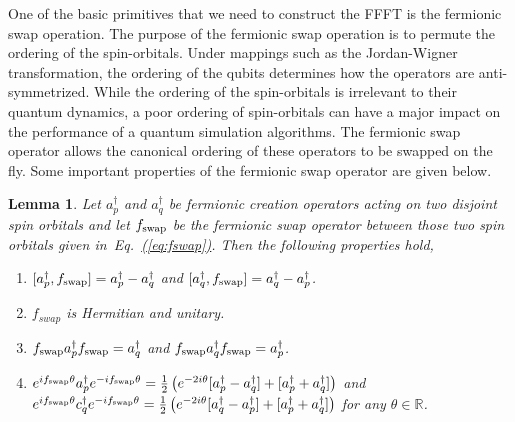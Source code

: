 \documentclass[superscriptaddress,aps,pra,nofootinbib,notitlepage,10pt,longbibliography]{revtex4-1}
\newtheorem{lemma}[theorem]{Lemma}
\newcommand{\eq}[1]{Eq.~\hyperref[eq:#1]{(\ref*{eq:#1})}}
\begin{document}
One of the basic primitives that we need to construct the FFFT is the fermionic swap operation. The purpose of the fermionic swap operation is to permute the ordering of the spin-orbitals. Under mappings such as the Jordan-Wigner transformation, the ordering of the qubits determines how the operators are anti-symmetrized.  While the ordering of the spin-orbitals is irrelevant to their quantum dynamics, a poor ordering of spin-orbitals can have a major impact on the performance of a quantum simulation algorithms. The fermionic swap operator allows the canonical ordering of these operators to be swapped on the fly. Some important properties of the fermionic swap operator are given below.
\begin{lemma}\label{lem:prop}
Let $a_p^\dagger$ and $a_q^\dagger$ be fermionic creation operators acting on two disjoint spin orbitals and let $f_{\rm swap}$ be the fermionic swap operator between those two spin orbitals given in~\eq{fswap}.  Then the following properties hold,
\begin{enumerate}
\item $[a_p^{\dagger},f_{\rm swap}]=a_p^\dagger-a_q^\dagger$ and $[a_q^{\dagger},f_{\rm swap}]=a_q^\dagger-a_p^\dagger$.
\item $f_{swap}$ is Hermitian and unitary.
\item $f_{\rm swap} a_p^\dagger f_{\rm swap}=a_q^\dagger$ and $f_{\rm swap} a_q^\dagger f_{\rm swap}=a_p^\dagger$.
\item $e^{if_{\rm swap}\theta}a_p^\dagger e^{-if_{\rm swap} \theta}= \frac{1}{2}\left(e^{-2i\theta}[a_p^\dagger -a_q^\dagger] + [a_p^\dagger +a_q^\dagger] \right)$ and $e^{if_{\rm swap}\theta}c_q^\dagger e^{-if_{\rm swap} \theta}= \frac{1}{2}\left(e^{-2i\theta}[a_q^\dagger -a_p^\dagger] + [a_p^\dagger +a_q^\dagger] \right)$ for any $\theta \in \mathbb{R}$.
\end{enumerate}
\end{lemma}
\end{document}
